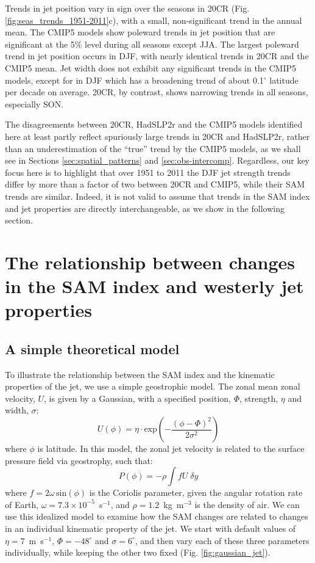 \documentclass{ametsoc}
\begin{document}
Trends in jet position vary in sign over the seasons in 20CR (Fig. \ref{fig:seas_trends_1951-2011}c),
with a small, non-significant trend in the annual mean. The CMIP5 models show poleward trends
in jet position that are significant at the 5\% level during all seasons except JJA. The largest poleward
trend in jet position occurs in DJF, with nearly identical trends in 20CR and the CMIP5 mean. Jet width
does not exhibit any significant trends in the CMIP5 models, except for in DJF which has a broadening
trend of about 0.1$^{\circ}$ latitude per decade on average. 20CR, by contrast, shows narrowing trends in
all seasons, especially SON.

The disagreements between 20CR, HadSLP2r and the CMIP5
models identified here at least partly reflect spuriously large trends in 20CR and HadSLP2r, rather than 
an underestimation of the ``true'' trend by the CMIP5 models, as we shall see in 
Sections  \ref{sec:spatial_patterns} and \ref{sec:obs-intercomp}. Regardless, our key focus 
here is to highlight that over 1951 to 2011 the DJF jet strength trends differ by more than
 a factor of two between 20CR and 
CMIP5, while their SAM trends are similar. Indeed, it is not valid to assume that trends in the 
SAM index and jet properties are directly interchangeable, as we show in the following section.

\section{The relationship between changes in the SAM index and westerly jet properties} \label{sec:sam_vs_jet}
\subsection{A simple theoretical model}
To illustrate the relationship between the SAM index and the kinematic properties of the jet,
we use a simple geostrophic model. The zonal mean zonal velocity, $U$, is 
given by a Gaussian, with a specified position, $\Phi$, strength, $\eta$ and width, $\sigma$:
\begin{equation}
U (\phi) = \eta \cdot \textrm{exp} \left( - \frac{ (\phi -\Phi)^2}{2 \sigma^2} \right )
\end{equation}
where $\phi$ is latitude. In this model, the zonal jet velocity is related to the surface pressure field 
via geostrophy, such that:
\begin{equation}
P(\phi) = - \rho \int f U  \;\delta y
\end{equation}
where $f=2\omega \,\textrm{sin} ( \phi)$ is the Coriolis parameter, given the angular rotation
rate of Earth, $\omega=7.3 \times10^{−5}$~s$^{-1}$, and $\rho=1.2$~kg~m$^{-3}$ is the 
density of air. We can use this idealized model to examine how the SAM changes are related 
to changes in an individual kinematic property of the jet. We start with default values of
$\eta=7$~m~s$^{-1}$, $\Phi=-48^{\circ}$ and $\sigma=6^{\circ}$, and then vary each of these 
three parameters individually, while keeping the other two fixed (Fig. \ref{fig:gaussian_jet}).
\end{document}
